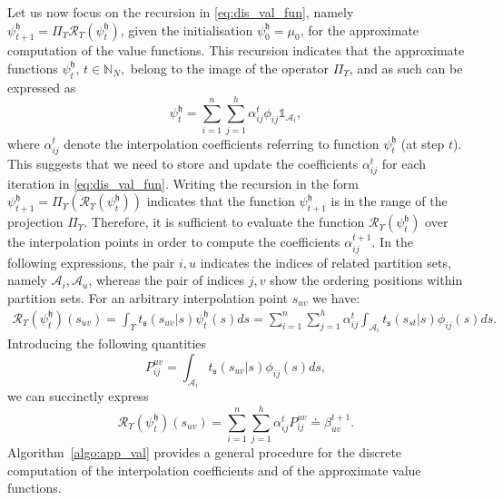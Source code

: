 \documentclass{LMCS}
\begin{document}
Let us now focus on the recursion in \eqref{eq:dis_val_fun}, 
namely $\psi_{t+1}^{\mathfrak h} = \Pi_{\Upsilon}\mathcal R_\Upsilon(\psi_t^{\mathfrak h})$, 
given the initialisation $\psi_0^{\mathfrak h} = \mu_0$, 
for the approximate computation of the value functions. 
This recursion indicates that the approximate functions $\psi_t^{\mathfrak h},\, t\in\mathbb N_N,$ belong to the image of the operator $\Pi_{\Upsilon}$, 
and as such can be expressed as 
\begin{equation*}
\psi^{\mathfrak h}_t = \sum_{i=1}^{n}\sum_{j=1}^{h}\alpha_{ij}^{t}\phi_{ij}\mathds{1}_{\mathcal A_i},
\end{equation*}
where $\alpha_{ij}^t$ denote the interpolation coefficients referring to function $\psi^{\mathfrak h}_t$ (at step $t$).  
This suggests that we need to store and update the coefficients $\alpha_{ij}^{t}$ for each iteration in \eqref{eq:dis_val_fun}.   
Writing the recursion in the form $\psi^{\mathfrak h}_{t+1} = \Pi_{\Upsilon}(\mathcal R_\Upsilon(\psi^{\mathfrak h}_t))$ indicates that the function $\psi^{\mathfrak h}_{t+1}$ is in the range of the projection $\Pi_{\Upsilon}$.
Therefore, it is sufficient to evaluate the function $\mathcal R_\Upsilon(\psi^{\mathfrak h}_t)$ over the interpolation points in order to compute the coefficients $\alpha_{ij}^{t+1}$.  
In the following expressions, 
the pair $i,u$ indicates the indices of related partition sets, 
namely $\mathcal A_i,\mathcal A_u$,
whereas the pair of indices $j,v$ show the ordering positions within partition sets. 
For an arbitrary interpolation point $s_{uv}$ we have:
\begin{align*}
\mathcal R_\Upsilon(\psi^{\mathfrak h}_t)(s_{uv})
= \int_{\Upsilon} t_{\mathfrak s}(s_{uv}|s)\psi^{\mathfrak h}_t(s)ds
 = \sum_{i=1}^{n}\sum_{j=1}^{h}\alpha_{ij}^{t}\int_{\mathcal A_i}t_{\mathfrak s}(s_{st}|s)\phi_{ij}(s)ds.
\end{align*}
Introducing the following quantities
\begin{equation*}
P_{ij}^{uv} = \int_{\mathcal A_i}t_{\mathfrak s}(s_{uv}|s)\phi_{ij}(s)ds,
\end{equation*}
we can succinctly express 
\begin{equation*} 
\mathcal R_\Upsilon(\psi^{\mathfrak h}_t)(s_{uv}) = 
\sum_{i=1}^{n}\sum_{j=1}^{h}\alpha_{ij}^{t}P_{ij}^{uv} \doteq \beta^{t+1}_{uv}.
\end{equation*}
Algorithm~\ref{algo:app_val} provides a general procedure for the discrete computation of the interpolation coefficients and of the approximate value functions.
\end{document}
